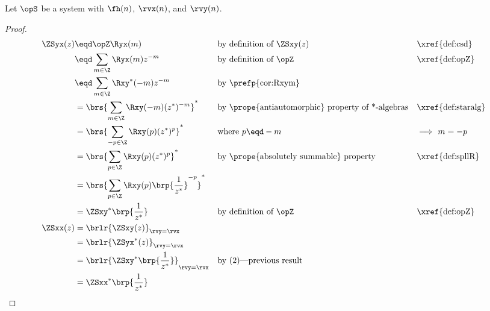 \begin{theorem}
\label{thm:ZSxy_sym}
Let $\opS$ be a system with  $\fh(n)$,
 $\rvx(n)$, and  $\rvy(n)$.
\end{theorem}
\begin{proof}
\begin{align*}
  \ZSyx(z)
     &\eqd \opZ \Ryx(m)
    && \text{by definition of $\ZSxy(z)$}                          && \text{\xref{def:csd}}
  \\&\eqd \sum_{m\in\Z}\Ryx(m) z^{-m}
    && \text{by definition of $\opZ$}                              && \text{\xref{def:opZ}}
  \\&\eqd \sum_{m\in\Z} \Rxy^\ast(-m) z^{-m}
    && \text{by \prefp{cor:Rxym}}
  \\&= \brs{\sum_{m\in\Z} \Rxy(-m) (z^\ast)^{-m}}^\ast
    && \text{by \prope{antiautomorphic} property of *-algebras}    && \text{\xref{def:staralg}}
  \\&= \brs{\sum_{-p\in\Z} \Rxy(p) (z^\ast)^{p}}^\ast
    && \text{where $p\eqd -m$}                                     && \text{$\implies$ $m=-p$}
  \\&= \brs{\sum_{p\in\Z} \Rxy(p) (z^\ast)^{p}}^\ast
    && \text{by \prope{absolutely summable} property}              && \text{\xref{def:spllR}}
  \\&= \brs{\sum_{p\in\Z} \Rxy(p) \brp{\frac{1}{z^\ast}}^{-p}}^\ast
  \\&= \ZSxy^\ast\brp{\frac{1}{z^\ast}}
    && \text{by definition of $\opZ$}                              && \text{\xref{def:opZ}}
  \\
  \ZSxx(z)
    &= \brlr{\ZSxy(z)}_{\rvy=\rvx}
  \\&= \brlr{\ZSyx^\ast(z)}_{\rvy=\rvx}
  \\&= \brlr{\ZSxy^\ast\brp{\frac{1}{z^\ast}}}_{\rvy=\rvx}
    && \text{by (2)---previous result}
  \\&= \ZSxx^\ast\brp{\frac{1}{z^\ast}}
\end{align*}
\end{proof}

